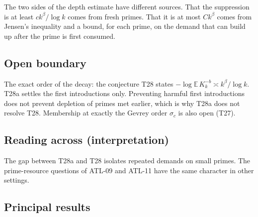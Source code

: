 \documentclass[
  11pt,
]{article}
\begin{document}
The two sides of the depth estimate have different sources. That the
suppression is at least \(ck^{\beta}/\log k\) comes from fresh primes.
That it is at most \(Ck^{\beta}\) comes from Jensen's inequality and a
bound, for each prime, on the demand that can build up after the prime
is first consumed.

\hypertarget{open-boundary-3}{%
\subsection{Open boundary}\label{open-boundary-3}}

The exact order of the decay: the conjecture T28 states
\(-\log\mathbb E\,K_k^{-b}\asymp k^{\beta}/\log k\). T28a settles the
first introductions only. Preventing harmful first introductions does
not prevent depletion of primes met earlier, which is why T28a does not
resolve T28. Membership at exactly the Gevrey order \(\sigma_c\) is also
open (T27).

\hypertarget{reading-across-interpretation-3}{%
\subsection{Reading across
(interpretation)}\label{reading-across-interpretation-3}}

The gap between T28a and T28 isolates repeated demands on small primes.
The prime-resource questions of ATL-09 and ATL-11 have the same
character in other settings.

\hypertarget{principal-results-3}{%
\subsection{Principal results}\label{principal-results-3}}
\end{document}

